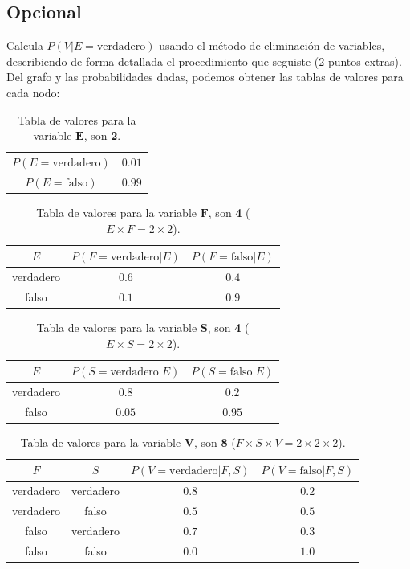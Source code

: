 \documentclass[12pt]{article}
\begin{document}
 \subsection{Opcional} Calcula $P(V|E=\text{verdadero})$ usando el método de eliminación de variables, describiendo de forma detallada el procedimiento que seguiste (2 puntos extras).\\
 Del grafo y las probabilidades dadas, podemos obtener las tablas de valores para cada nodo:\\
 \begin{table}[h!]
 	\centering
 	\begin{tabular}{|c|c|}
 		\hline
 		\rowcolor[gray]{.8}
 		\multicolumn{2}{|c|}{$P(E)$}  \\\hline %
 		$P(E=\text{verdadero})$ & $0.01$\\\hline
 		$P(E=\text{falso})$ & $0.99$\\\hline
 	\end{tabular}
 	\caption{Tabla de valores para la variable $\pmb{E}$, son \textbf{2}.}
 	\label{tab:ej3001}
 \end{table}
\begin{table}[h!]
	\centering
	\begin{tabular}{|c|c|c|}
		\hline
		\rowcolor[gray]{.8}
		$E$&$P(F=\text{verdadero}|E)$&$P(F=\text{falso}|E)$ \\\hline %
		verdadero & $0.6$ &$0.4$\\\hline
		falso & $0.1$ &$0.9$\\\hline
	\end{tabular}
	\caption{Tabla de valores para la variable $\pmb{F}$, son \textbf{4} ($E\times F=2\times 2$).}
	\label{tab:ej3002}
\end{table}
\begin{table}[h!]
	\centering
	\begin{tabular}{|c|c|c|}
		\hline
		\rowcolor[gray]{.8}
		$E$&$P(S=\text{verdadero}|E)$&$P(S=\text{falso}|E)$ \\\hline %
		verdadero & $0.8$ &$0.2$\\\hline
		falso & $0.05$ &$0.95$\\\hline
	\end{tabular}
	\caption{Tabla de valores para la variable $\pmb{S}$, son \textbf{4} ($E\times S=2\times 2$).}
	\label{tab:ej3003}
\end{table}
 \begin{table}[h!]
 	\centering
 	\begin{tabular}{|c|c|c|c|}
 		\hline
 		\rowcolor[gray]{.8}
 		$F$&$S$&$P(V=\text{verdadero}|F,S)$&$P(V=\text{falso}|F,S)$ \\\hline %
 		verdadero & verdadero & $0.8$ &$0.2$\\\hline
 		verdadero & falso & $0.5$ &$0.5$\\\hline
 		falso & verdadero & $0.7$ &$0.3$\\\hline
 		falso & falso & $0.0$ &$1.0$\\\hline
 	\end{tabular}
 	\caption{Tabla de valores para la variable $\pmb{V}$, son \textbf{8} ($F\times S\times V=2\times 2 \times 2$).}
 	\label{tab:ej3004}
 \end{table}
\end{document}
